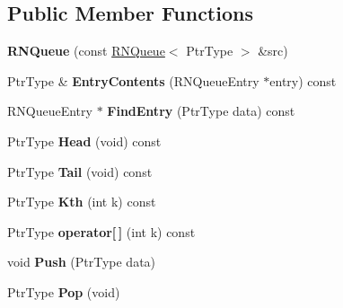 \subsection*{Public Member Functions}
\begin{DoxyCompactItemize}
\item 
{\bfseries R\+N\+Queue} (const \hyperlink{class_r_n_queue}{R\+N\+Queue}$<$ Ptr\+Type $>$ \&src)\hypertarget{class_r_n_queue_a72e60248108c04a7c8896db5bffa6032}{}\label{class_r_n_queue_a72e60248108c04a7c8896db5bffa6032}

\item 
Ptr\+Type \& {\bfseries Entry\+Contents} (R\+N\+Queue\+Entry $\ast$entry) const \hypertarget{class_r_n_queue_aecdaaf012af7e2871d6d595bbe66427d}{}\label{class_r_n_queue_aecdaaf012af7e2871d6d595bbe66427d}

\item 
R\+N\+Queue\+Entry $\ast$ {\bfseries Find\+Entry} (Ptr\+Type data) const \hypertarget{class_r_n_queue_aefa935fb11c14e74b78767953962ef0c}{}\label{class_r_n_queue_aefa935fb11c14e74b78767953962ef0c}

\item 
Ptr\+Type {\bfseries Head} (void) const \hypertarget{class_r_n_queue_a8219ba18c1e837cc2f64d3f5186023f7}{}\label{class_r_n_queue_a8219ba18c1e837cc2f64d3f5186023f7}

\item 
Ptr\+Type {\bfseries Tail} (void) const \hypertarget{class_r_n_queue_a6443743a481be0293808fcf62adc806b}{}\label{class_r_n_queue_a6443743a481be0293808fcf62adc806b}

\item 
Ptr\+Type {\bfseries Kth} (int k) const \hypertarget{class_r_n_queue_a67086702a6c1771d7238f93bdacad0b0}{}\label{class_r_n_queue_a67086702a6c1771d7238f93bdacad0b0}

\item 
Ptr\+Type {\bfseries operator\mbox{[}$\,$\mbox{]}} (int k) const \hypertarget{class_r_n_queue_a00f0d713af9c15bee67a836c0b6af9a5}{}\label{class_r_n_queue_a00f0d713af9c15bee67a836c0b6af9a5}

\item 
void {\bfseries Push} (Ptr\+Type data)\hypertarget{class_r_n_queue_aef0d2d689f038d1c7ce1e20f923fdba4}{}\label{class_r_n_queue_aef0d2d689f038d1c7ce1e20f923fdba4}

\item 
Ptr\+Type {\bfseries Pop} (void)\hypertarget{class_r_n_queue_aece67e786b067ea7b330dd7db62b0376}{}\label{class_r_n_queue_aece67e786b067ea7b330dd7db62b0376}


\end{DoxyCompactItemize}
